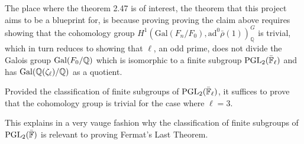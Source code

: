 The place where the theorem 2.47 is of interest, the theorem that this project aims to be a blueprint for, is because proving proving the claim above requires showing that the 
cohomology group  $H^1(\textrm{Gal}(F_n / F_0), \textrm{ad}^0\bar{\rho}(1))^G_{\mathbb{Q}}$ is trivial, which in turn reduces to showing that $\ell$, an odd prime, does not divide the Galois group $\operatorname{Gal}(F_0 /\mathbb{Q})$ which is isomorphic to a finite subgroup $\operatorname{PGL}_2(\bar{\mathbb{F}}_\ell)$
and has $\operatorname{Gal}(\mathbb{Q}(\zeta_\ell)/\mathbb{Q})$ as a quotient.

Provided the classification of finite subgroups of $\operatorname{PGL}_2(\bar{\mathbb{F}}_\ell)$, it suffices to prove that the cohomology group is trivial for the case where $\ell = 3$.

This explains in a very vauge fashion why the classification of finite subgroups of $\operatorname{PGL}_2(\bar{\mathbb{F}})$ is relevant to proving Fermat's Last Theorem.










